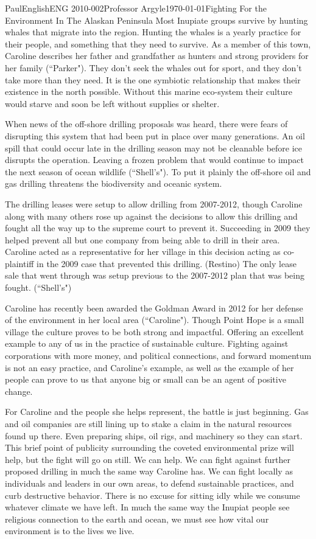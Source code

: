 \documentclass[12pt,letterpaper]{article}
\begin{document}
\begin{mla}{Paul}{English}{ENG 2010-002}{Professor Argyle}{\today}{Fighting For the Environment In The Alaskan Peninsula}
Most Inupiate groups survive by hunting whales that migrate into the region. Hunting the whales is a yearly practice for their people, and something that they need to survive. As a member of this town, Caroline describes her father and grandfather as hunters and strong providers for her family (``Parker"). They don't seek the whales out for sport, and they don't take more than they need. It is the one symbiotic relationship that makes their existence in the north possible. Without this marine eco-system their culture would starve and soon be left without supplies or shelter.

When news of the off-shore drilling proposals was heard, there were fears of disrupting this system that had been put in place over many generations. An oil spill that could occur late in the drilling season may not be cleanable before ice disrupts the operation. Leaving a frozen problem that would continue to impact the next season of ocean wildlife (``Shell's"). To put it plainly the off-shore oil and gas drilling threatens the biodiversity and oceanic system.

The drilling leases were setup to allow drilling from 2007-2012, though Caroline along with many others rose up against the decisions to allow this drilling and fought all the way up to the supreme court to prevent it. Succeeding in 2009 they helped prevent all but one company from being able to drill in their area. Caroline acted as a representative for her village in this decision acting as co-plaintiff in the 2009 case that prevented this drilling. (Restino) The only lease sale that went through was setup previous to the 2007-2012 plan that was being fought. (``Shell's")

Caroline has recently been awarded the Goldman Award in 2012 for her defense of the environment in her local area (``Caroline"). Though Point Hope is a small village the culture proves to be both strong and impactful. Offering an excellent example to any of us in the practice of sustainable culture. Fighting against corporations with more money, and political connections, and forward momentum is not an easy practice, and Caroline's example, as well as the example of her people can prove to us that anyone big or small can be an agent of positive change. 

For Caroline and the people she helps represent, the battle is just beginning. Gas and oil companies are still lining up to stake a claim in the natural resources found up there. Even preparing ships, oil rigs, and machinery so they can start. This brief point of publicity surrounding the coveted environmental prize will help, but the fight will go on still. We can help. We can fight against further proposed drilling in much the same way Caroline has. We can fight locally as individuals and leaders in our own areas, to defend sustainable practices, and curb destructive behavior. There is no excuse for sitting idly while we consume whatever climate we have left. In much the same way the Inupiat people see religious connection to the earth and ocean, we must see how vital our environment is to the lives we live.


\end{mla}
\end{document}
